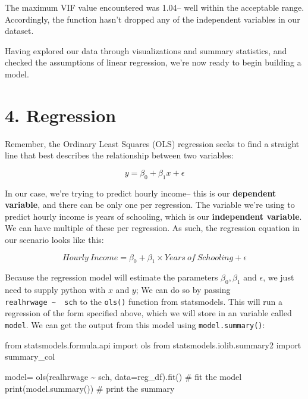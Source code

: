 \documentclass[
  letterpaper,
  DIV=11,
  numbers=noendperiod]{scrreprt}
\newenvironment{Shaded}{\begin{snugshade}}{\end{snugshade}}
\newcommand{\BuiltInTok}[1]{\textcolor[rgb]{0.00,0.23,0.31}{#1}}
\newcommand{\CommentTok}[1]{\textcolor[rgb]{0.37,0.37,0.37}{#1}}
\newcommand{\ImportTok}[1]{\textcolor[rgb]{0.00,0.46,0.62}{#1}}
\newcommand{\NormalTok}[1]{\textcolor[rgb]{0.00,0.23,0.31}{#1}}
\newcommand{\OperatorTok}[1]{\textcolor[rgb]{0.37,0.37,0.37}{#1}}
\newcommand{\StringTok}[1]{\textcolor[rgb]{0.13,0.47,0.30}{#1}}
\begin{document}
The maximum VIF value encountered was 1.04-- well within the acceptable
range. Accordingly, the function hasn't dropped any of the independent
variables in our dataset.

Having explored our data through visualizations and summary statistics,
and checked the assumptions of linear regression, we're now ready to
begin building a model.

\hypertarget{regression-1}{%
\section{4. Regression}\label{regression-1}}

Remember, the Ordinary Least Squares (OLS) regression seeks to find a
straight line that best describes the relationship between two
variables:

\[y= \beta_0 + \beta_1x+\epsilon \]

In our case, we're trying to predict hourly income-- this is our
\textbf{dependent variable}, and there can be only one per regression.
The variable we're using to predict hourly income is years of schooling,
which is our \textbf{independent variable}. We can have multiple of
these per regression. As such, the regression equation in our scenario
looks like this:

\[Hourly\ Income= \beta_0 + \beta_1 \times Years\ of\ Schooling +\epsilon \]

Because the regression model will estimate the parameters
\(\beta_0, \beta_1\) and \(\epsilon\), we just need to supply python
with \(x\) and \(y\); We can do so by passing
\texttt{realhrwage\ \textasciitilde{}\ \ sch} to the \texttt{ols()}
function from statsmodels. This will run a regression of the form
specified above, which we will store in an variable called
\texttt{model}. We can get the output from this model using
\texttt{model.summary()}:

\begin{Shaded}
\begin{Highlighting}[]
\ImportTok{from}\NormalTok{ statsmodels.formula.api }\ImportTok{import}\NormalTok{ ols}
\ImportTok{from}\NormalTok{ statsmodels.iolib.summary2 }\ImportTok{import}\NormalTok{ summary\_col}

\NormalTok{model}\OperatorTok{=}\NormalTok{ ols(}\StringTok{\textquotesingle{}realhrwage \textasciitilde{}  sch\textquotesingle{}}\NormalTok{, data}\OperatorTok{=}\NormalTok{reg\_df).fit() }\CommentTok{\# fit the model}
\BuiltInTok{print}\NormalTok{(model.summary()) }\CommentTok{\# print the summary}
\end{Highlighting}
\end{Shaded}
\end{document}
